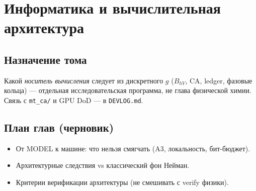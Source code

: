 \part{Информатика и вычислительная архитектура}

\chapter{Назначение тома}
Какой \emph{носитель вычисления} следует из дискретного $g$
($B_{hV}$, CA, ledger, фазовые кольца) --- отдельная исследовательская программа,
не глава физической химии. Связь с \texttt{mt\_ca/} и GPU DoD --- в \texttt{DEVLOG.md}.

\chapter{План глав (черновик)}
\begin{itemize}
  \item От MODEL к машине: что нельзя смягчать (A3, локальность, бит-бюджет).
  \item Архитектурные следствия vs классический фон Нейман.
  \item Критерии верификации архитектуры (не смешивать с verify физики).
\end{itemize}
